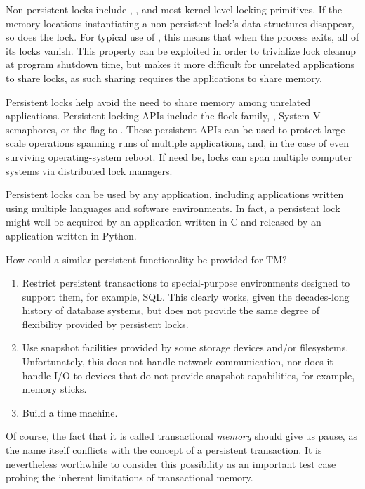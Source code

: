 Non-persistent locks include ,
, and most kernel-level locking primitives.
If the memory locations instantiating a non-persistent lock's data
structures disappear, so does the lock.
For typical use of , this means that when the
process exits, all of its locks vanish.
This property can be exploited in order to trivialize lock cleanup
at program shutdown time, but makes it more difficult for unrelated
applications to share locks, as such sharing requires the applications
to share memory.

Persistent locks help avoid the need to share memory among unrelated
applications.
Persistent locking APIs include the flock family, , System
V semaphores, or the  flag to .
These persistent APIs can be used to protect large-scale operations
spanning runs of multiple applications, and, in the case of 
even surviving operating-system reboot.
If need be, locks can span multiple computer systems via distributed
lock managers.

Persistent locks can be used by any application, including applications
written using multiple languages and software environments.
In fact, a persistent lock might well be acquired by an application written
in C and released by an application written in Python.

How could a similar persistent functionality be provided for TM?

\begin{enumerate}
\item	Restrict persistent transactions to special-purpose environments
	designed to support them, for example, SQL.
	This clearly works, given the decades-long history of database
	systems, but does not provide the same degree of flexibility
	provided by persistent locks.
\item	Use snapshot facilities provided by some storage devices and/or
	filesystems.
	Unfortunately, this does not handle network communication,
	nor does it handle I/O to devices that do not provide snapshot
	capabilities, for example, memory sticks.
\item	Build a time machine. 
\end{enumerate}

Of course, the fact that it is called transactional \emph{memory}
should give us pause, as the name itself conflicts with the concept of
a persistent transaction.
It is nevertheless worthwhile to consider this possibility as an important
test case probing the inherent limitations of transactional memory.

